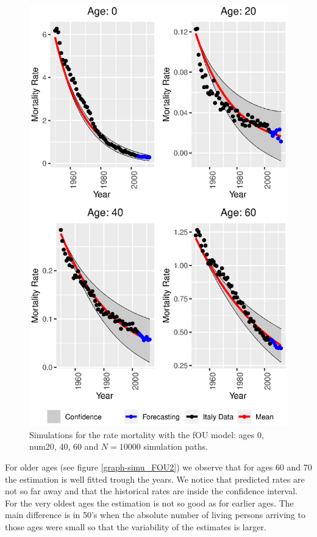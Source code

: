 \documentclass[smallextended]{svjour3}
\begin{document}
    \begin{figure}[H]
        \includegraphics{man_confidence_bands.eps}
        \caption{%
            Simulations for the rate mortality with the fOU model: ages
            \num{0}, num{20}, \num{40}, \num{60} and $N=\num{10000}$ simulation
            paths.
        }
        \label{graph-simu_FOU1_}
    \end{figure}


        For older ages (see figure \ref{graph-simu_FOU2}) we observe that for 
    ages \num{60} and \num{70} the estimation is well fitted trough the years. 
    We notice that predicted rates are not so far away and that the historical 
    rates are inside the confidence interval. For the very oldest ages the 
    estimation is not so good as for earlier ages. The main difference is in 
    \num{50}'s when the absolute number of
    living persons arriving to those ages were small so that the variability of 
    the estimates is larger. 
\end{document}
